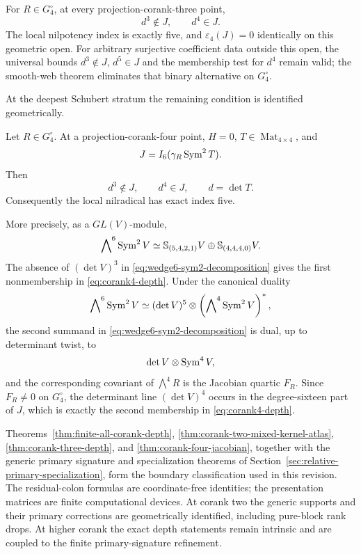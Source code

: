 \begin{theorem}
\label{thm:corank-three-depth}
For \(R\in G_4^\circ\), at every projection-corank-three point,
\begin{equation}\label{eq:corank3-no-d3}
 d^3\notin J,\qquad d^4\in J.
\end{equation}
The local nilpotency index is exactly five, and
\(\varepsilon_4(J)=0\) identically on this geometric open.
For arbitrary surjective coefficient data outside this open, the
universal bounds \(d^3\notin J\), \(d^5\in J\) and the membership
test for \(d^4\) remain valid; the smooth-web theorem eliminates
that binary alternative on \(G_4^\circ\).
\end{theorem}

At the deepest Schubert stratum the remaining condition is identified
geometrically.

\begin{theorem}
\label{thm:corank-four-jacobian}
Let \(R\in G_4^\circ\).  At a projection-corank-four point,
\(H=0\), \(T\in\operatorname{Mat}_{4\times4}\), and
\[
 J=I_6(\gamma_R\operatorname{Sym}^2T).
\]
Then
\begin{equation}\label{eq:corank4-depth}
 d^3\notin J,\qquad d^4\in J,\qquad d=\det T.
\end{equation}
Consequently the local nilradical has exact index five.

More precisely, as a \(GL(V)\)-module,
\begin{equation}\label{eq:wedge6-sym2-decomposition}
 \bigwedge\nolimits^6\operatorname{Sym}^2V
 \simeq
 \mathbb S_{(5,4,2,1)}V
 \oplus
 \mathbb S_{(4,4,4,0)}V.
\end{equation}
The absence of \((\det V)^3\) in
\eqref{eq:wedge6-sym2-decomposition} gives the first
nonmembership in \eqref{eq:corank4-depth}.  Under the canonical
duality
\[
 \bigwedge\nolimits^6\operatorname{Sym}^2V
 \simeq
 (\det V)^5\otimes
 \left(\bigwedge\nolimits^4\operatorname{Sym}^2V\right)^*,
\]
the second summand in \eqref{eq:wedge6-sym2-decomposition} is dual,
up to determinant twist, to
\[
 \det V\otimes\operatorname{Sym}^4V,
\]
and the corresponding covariant of \(\bigwedge^4R\) is the Jacobian
quartic \(F_R\).  Since \(F_R\ne0\) on \(G_4^\circ\), the determinant
line \((\det V)^4\) occurs in the degree-sixteen part of \(J\), which
is exactly the second membership in
\eqref{eq:corank4-depth}.
\end{theorem}

Theorems~\ref{thm:finite-all-corank-depth},
\ref{thm:corank-two-mixed-kernel-atlas},
\ref{thm:corank-three-depth}, and
\ref{thm:corank-four-jacobian}, together with the generic primary
signature and specialization theorems of
Section~\ref{sec:relative-primary-specialization}, form the boundary
classification used in this revision.  The residual-colon formulas
are coordinate-free identities; the presentation matrices are finite
computational devices.  At corank two the generic supports and their
primary corrections are geometrically identified, including pure-block
rank drops.  At higher corank the exact depth statements remain
intrinsic and are coupled to the finite primary-signature refinement.
